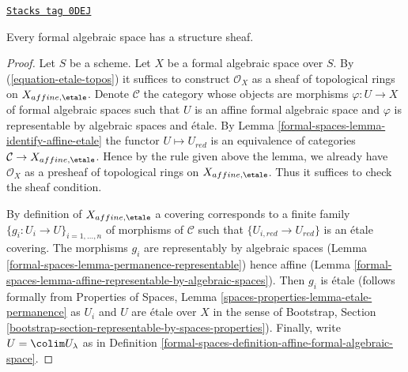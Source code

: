 \begin{lemma}
\label{formal-spaces-lemma-structure-sheaf}
\href{https://stacks.math.columbia.edu/tag/0DEJ}{\texttt{Stacks tag 0DEJ}}

Every formal algebraic space has a structure sheaf.
\end{lemma}

\begin{proof}
Let $S$ be a scheme. Let $X$ be a formal algebraic space over $S$.
By (\ref{equation-etale-topos}) it suffices to construct $\mathcal{O}_X$
as a sheaf of topological rings on $X_{affine, \etale}$.
Denote $\mathcal{C}$ the category whose objects
are morphisms $\varphi : U \to X$ of formal algebraic spaces such that
$U$ is an affine formal algebraic space and
$\varphi$ is representable by algebraic spaces and \'etale.
By Lemma \ref{formal-spaces-lemma-identify-affine-etale}
the functor $U \mapsto U_{red}$ is an equivalence of categories
$\mathcal{C} \to X_{affine, \etale}$. Hence by the rule given
above the lemma, we already have $\mathcal{O}_X$ as a presheaf of
topological rings on $X_{affine, \etale}$. Thus it suffices to check
the sheaf condition.

\medskip\noindent
By definition of $X_{affine, \etale}$ a covering corresponds to a finite
family $\{g_i : U_i \to U\}_{i = 1, \ldots, n}$ of morphisms of $\mathcal{C}$
such that $\{U_{i, red} \to U_{red}\}$ is an \'etale covering.
The morphisms $g_i$ are representably by algebraic spaces
(Lemma \ref{formal-spaces-lemma-permanence-representable}) hence affine
(Lemma \ref{formal-spaces-lemma-affine-representable-by-algebraic-spaces}).
Then $g_i$ is \'etale (follows formally from
Properties of Spaces, Lemma \ref{spaces-properties-lemma-etale-permanence}
as $U_i$ and $U$ are \'etale over $X$ in the sense of
Bootstrap, Section \ref{bootstrap-section-representable-by-spaces-properties}).
Finally, write $U = \colim U_\lambda$ as in
Definition \ref{formal-spaces-definition-affine-formal-algebraic-space}.


\end{proof}
